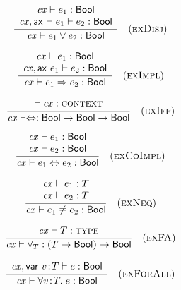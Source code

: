 \begin{theorem}\label{thm-edisj}
{\rm
\[
\frac{\begin{array}{c}\mathit{cx}\vdash e_1:\mathsf{Bool}\\\mathit{cx},\mathsf{ax}\ \neg\;e_1\vdash e_2:\mathsf{Bool}\end{array}}{\mathit{cx}\vdash e_1\vee e_2:\mathsf{Bool}}\quad\mbox{(\textsc{exDisj})}
\]
}
\end{theorem}

\begin{theorem}\label{thm-eimpl}
{\rm
\[
\frac{\begin{array}{c}\mathit{cx}\vdash e_1:\mathsf{Bool}\\\mathit{cx},\mathsf{ax}\ e_1\vdash e_2:\mathsf{Bool}\end{array}}{\mathit{cx}\vdash e_1\Rightarrow e_2:\mathsf{Bool}}\quad\mbox{(\textsc{exImpl})}
\]
}
\end{theorem}

\begin{theorem}\label{thm-eiff}
{\rm
\[
\frac{\begin{array}{c}\vdash\mathit{cx}:\textsc{context}\end{array}}{\mathit{cx}\vdash\Leftrightarrow:\mathsf{Bool}\to\mathsf{Bool}\to\mathsf{Bool}}\quad\mbox{(\textsc{exIff})}
\]
}
\end{theorem}

\begin{theorem}\label{thm-ecoimpl}
{\rm
\[
\frac{\begin{array}{c}\mathit{cx}\vdash e_1:\mathsf{Bool}\\\mathit{cx}\vdash e_2:\mathsf{Bool}\end{array}}{\mathit{cx}\vdash e_1\Leftrightarrow e_2:\mathsf{Bool}}\quad\mbox{(\textsc{exCoImpl})}
\]
}
\end{theorem}

\begin{theorem}\label{thm-eneq}
{\rm
\[
\frac{\begin{array}{c}\mathit{cx}\vdash e_1:T\\\mathit{cx}\vdash e_2:T\end{array}}{\mathit{cx}\vdash e_1\not\equiv e_2:\mathsf{Bool}}\quad\mbox{(\textsc{exNeq})}
\]
}
\end{theorem}

\begin{theorem}\label{thm-efaop}
{\rm
\[
\frac{\begin{array}{c}\mathit{cx}\vdash T:\textsc{type}\end{array}}{\mathit{cx}\vdash\forall_{T}:(T\to\mathsf{Bool})\to\mathsf{Bool}}\quad\mbox{(\textsc{exFA})}
\]
}
\end{theorem}

\begin{theorem}\label{thm-efa}
{\rm
\[
\frac{\begin{array}{c}\mathit{cx},\mathsf{var}\ v\!:\!T\vdash e:\mathsf{Bool}\end{array}}{\mathit{cx}\vdash\forall v\!:\!T.\;e:\mathsf{Bool}}\quad\mbox{(\textsc{exForAll})}
\]
}
\end{theorem}



